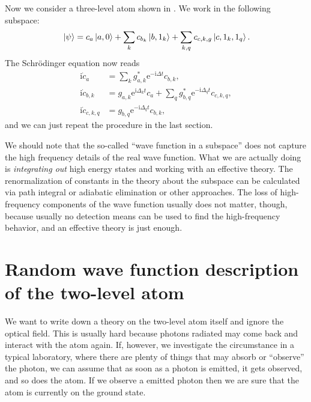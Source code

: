 \documentclass[hyperref, a4paper]{article}
\newcommand*{\ii}{\mathrm{i}}
\newcommand*{\ee}{\mathrm{e}}
\begin{document}
Now we consider a three-level atom shown in . We work in the following 
subspace:
\begin{equation}
    \ket*{\psi} = c_a \ket*{a, 0} + \sum_k c_{b_k} \ket*{b, 1_k} + \sum_{k, q} c_{c, k, g} \ket*{c, 1_k, 1_q}. 
\end{equation}
The Schrödinger equation now reads 
\begin{equation}
    \begin{aligned}
        \ii \dot{c}_a &= \sum_k g_{a, k}^* \ee^{- \ii \Delta t} c_{b, k}, \\
        \ii \dot{c}_{b, k} &= g_{a,k} \ee^{\ii \Delta_k t} c_a 
        + \sum_q g^*_{b,q} \ee^{- \ii \Delta_q t} c_{c, k, q}, \\
        \ii \dot{c}_{c, k, q} &= g_{b,q} \ee^{- \ii \Delta_q t} c_{b, k},
    \end{aligned}
\end{equation} 
and we can just repeat the procedure in the last section.

\begin{note*}{}{}
    We should note that the so-called ``wave function in a subspace'' does not capture the high frequency 
    details of the real wave function. What we are actually doing is \emph{integrating out} high energy 
    states and working with an effective theory. The renormalization of constants in the theory about 
    the subspace can be calculated via path integral or adiabatic elimination or other approaches.
    The loss of high-frequency components of the wave function usually does not matter, though, 
    because usually no detection means can be used to find the high-frequency behavior, and an effective
    theory is just enough.
\end{note*}

\section{Random wave function description of the two-level atom}\label{sec:stochastic-two-level}

We want to write down a theory on the two-level atom itself and ignore the optical field. 
This is usually hard because photons radiated may come back and interact with the atom again.
If, however, we investigate the circumstance in a typical laboratory, where there are plenty 
of things that may absorb or ``observe'' the photon, we can assume that as soon as a photon 
is emitted, it gets observed, and so does the atom. If we observe a emitted photon then we are sure 
that the atom is currently on the ground state.
\end{document}
